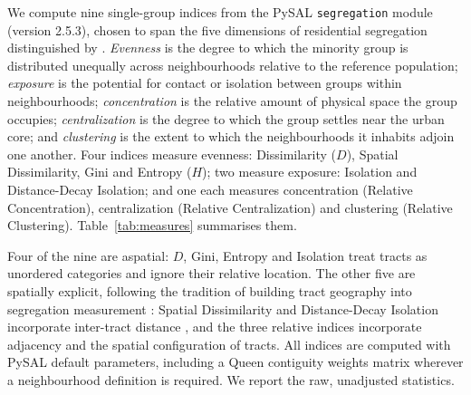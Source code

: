 \documentclass[12pt,a4paper]{article}
\begin{document}
We compute nine single-group indices from the PySAL \texttt{segregation} module (version 2.5.3), chosen to span the five dimensions of residential segregation distinguished by \citet{massey1988dimensions}. \emph{Evenness} is the degree to which the minority group is distributed unequally across neighbourhoods relative to the reference population; \emph{exposure} is the potential for contact or isolation between groups within neighbourhoods; \emph{concentration} is the relative amount of physical space the group occupies; \emph{centralization} is the degree to which the group settles near the urban core; and \emph{clustering} is the extent to which the neighbourhoods it inhabits adjoin one another. Four indices measure evenness: Dissimilarity ($D$), Spatial Dissimilarity, Gini and Entropy ($H$); two measure exposure: Isolation and Distance-Decay Isolation; and one each measures concentration (Relative Concentration), centralization (Relative Centralization) and clustering (Relative Clustering). Table~\ref{tab:measures} summarises them.

Four of the nine are aspatial: $D$, Gini, Entropy and Isolation treat tracts as unordered categories and ignore their relative location. The other five are spatially explicit, following the tradition of building tract geography into segregation measurement \citep{rey2004spatial}: Spatial Dissimilarity and Distance-Decay Isolation incorporate inter-tract distance \citep{wong1993spatial, morgan1983distance}, and the three relative indices incorporate adjacency and the spatial configuration of tracts. All indices are computed with PySAL default parameters, including a Queen contiguity weights matrix wherever a neighbourhood definition is required. We report the raw, unadjusted statistics.
\end{document}
